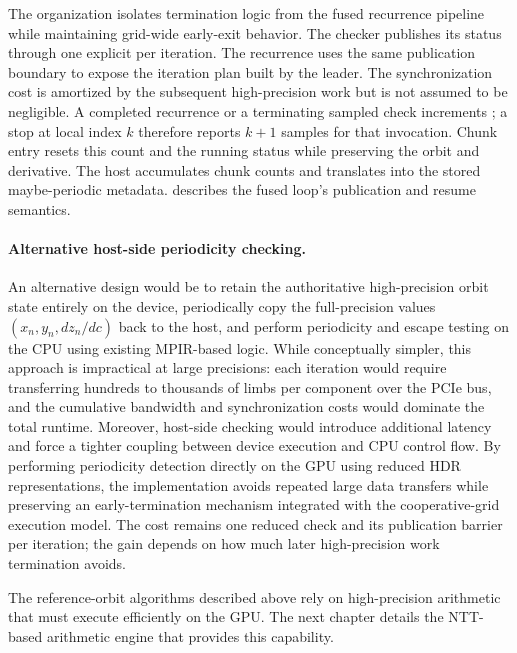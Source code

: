 The organization isolates termination logic from the fused recurrence pipeline
while maintaining grid-wide early-exit behavior.  The checker publishes its
status through one explicit  per iteration.  The recurrence uses the same publication
boundary to expose the iteration plan built by the leader.  The synchronization
cost is amortized by the subsequent high-precision work but is not assumed to be
negligible. A completed recurrence or a terminating sampled check increments
; a stop at local index $k$ therefore reports $k+1$
samples for that invocation. Chunk entry resets this count and the running
status while preserving the orbit and derivative. The host accumulates chunk
counts and translates  into the stored maybe-periodic
metadata.  describes the fused loop's
publication and resume semantics.

\paragraph{Alternative host-side periodicity checking.}
An alternative design would be to retain the authoritative high-precision orbit
state entirely on the device, periodically copy the full-precision values
\((x_n, y_n, dz_n/dc)\) back to the host, and perform periodicity and escape
testing on the CPU using existing MPIR-based logic. While conceptually simpler,
this approach is impractical at large precisions: each iteration would require
transferring hundreds to thousands of limbs per component over the PCIe bus,
and the cumulative bandwidth and synchronization costs would dominate the total
runtime. Moreover, host-side checking would introduce additional latency and
force a tighter coupling between device execution and CPU control flow. By
performing periodicity detection directly on the GPU using reduced HDR
representations, the implementation avoids repeated large data transfers while
preserving an early-termination mechanism integrated with the
cooperative-grid execution model.  The cost remains one reduced check and its
publication barrier per iteration; the gain depends on how much later
high-precision work termination avoids.

The reference-orbit algorithms described above rely on high-precision arithmetic
that must execute efficiently on the GPU.  The next chapter details the
NTT-based arithmetic engine that provides this capability.
